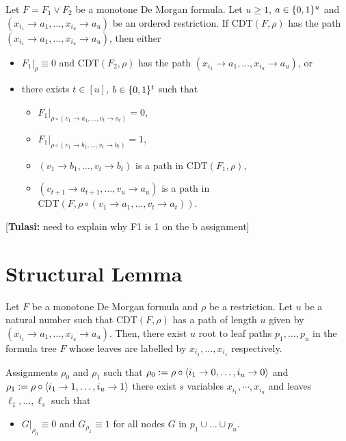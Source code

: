 \documentclass{article}
\newcommand{\cdt}{\mathrm{CDT}}
\newcommand{\xvars}{x_{i_1}, \ldots , x_{i_s}}
\newcommand{\tulasi}[1]{{\color{teal} [{\bf Tulasi:} #1]}}
\begin{document}
    \begin{claim}[Unpacking]
    \label{claim:unpacking}
        Let $F = F_1 \vee F_2$ be a monotone De Morgan formula.
        Let $u \geq 1$, $a \in \{0,1\}^{u}$ and  $(x_{i_1} \to a_1, \ldots , x_{i_u} \to a_u)$ be an ordered restriction.
        If $\cdt(F,\rho)$ has the path $(x_{i_1} \to a_1, \ldots , x_{i_u} \to a_u)$, then either       
    \begin{itemize}
        \item $F_1|_{\rho} \equiv 0$ and $\cdt(F_2,\rho)$ has the path $(x_{i_1} \to a_1, \ldots , x_{i_u} \to a_u)$,     
        or 
        \item there exists $t \in [u]$, $b \in \{0,1\}^{t}$ such that 
        \begin{itemize}
            \item $F_1|_{\rho \circ (v_1 \to a_1, \dots , v_t \to a_t)} = 0$,
            \item $F_1|_{\rho \circ (v_1 \to b_1, \dots , v_t \to b_t)} = 1$,
            \item $(v_1 \to b_1, \dots , v_t \to b_t)$ is a path in $\cdt(F_1,\rho)$,
            \item $(v_{t+1} \to a_{t+1}, \dots , v_u \to a_u)$ is a path in $\cdt(F,\rho \circ (v_1 \to a_1, \dots , v_t \to a_t))$.
        \end{itemize}
    \end{itemize}
    \tulasi{need to explain why F1 is 1 on the b assignment} 
    \end{claim}

\section{Structural Lemma}



\begin{lemma}
    \label{lem:structural lemma}
    Let $F$ be a monotone De Morgan formula and $\rho$ be a restriction. Let $u$ be a natural number such that $\cdt(F,\rho)$ has a path of length $u$ given by $(x_{i_1} \to a_1, \dots , x_{i_u} \to a_u)$. Then, there exist
    $u$ root to leaf paths $p_1, \ldots , p_u$ in the formula tree $F$ whose leaves are labelled by $\xvars$ respectively. 
    
    Assignments $\rho_0$ and $\rho_1$ such that 
    $\rho_0 := \rho \circ \left\langle i_1 \to 0, \dots , i_u \to 0\right\rangle$
    and
    $\rho_1 := \rho \circ \left\langle i_1 \to 1, \dots , i_u \to 1\right\rangle$
    there exist $s$ variables $x_{i_1},\cdots ,x_{i_u}$ and leaves $\ell_1, \ldots, \ell_s$ such that 
    \begin{itemize}
        \item $G|_{\rho_0} \equiv 0$ and $G_{\rho_1} \equiv 1$ for all nodes $G$ in $p_1 \cup \dots \cup p_u$. 
    \end{itemize}
\end{lemma}    
\end{document}
